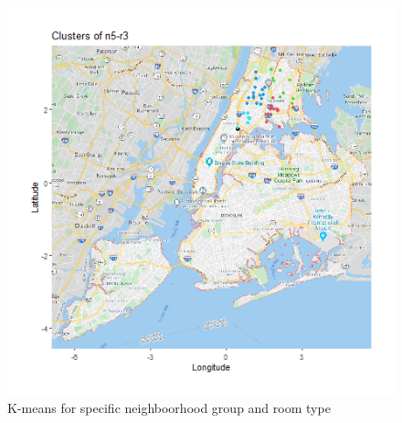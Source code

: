 \documentclass{FR16}
\begin{document}
\begin{figure}[!htb]
\begin{minipage}{0.33\textwidth}
   \end{minipage}
   \begin{minipage}{0.33\textwidth}
     \centering
     \includegraphics[width=1\linewidth]{figures/clust-n5-r3.png} 
   \end{minipage}\hfill
           \caption{K-means for specific neighboorhood group and room type}\label{fig:25}

\end{figure}
\end{document}
